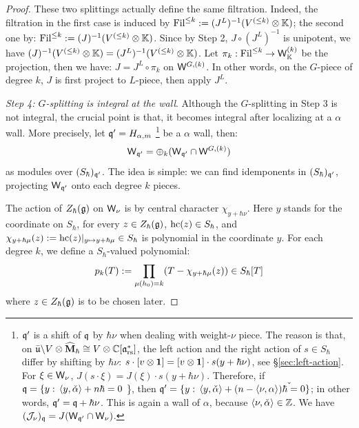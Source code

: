 \documentclass{article}
\theoremstyle{plain}
\theoremstyle{definition}
\theoremstyle{remark}
\numberwithin{equation}{section}
\begin{document}
\begin{proof}
These two splittings actually define the same filtration. Indeed, the filtration in the first case is induced by $\mathrm{Fil}^{\leq k} := (J^L)^{-1} (V^{(\leq k)}\otimes \mathbb K ) $; the second one by: $\mathrm{Fil}^{\leq k} := (J)^{-1} (V^{(\leq k)}\otimes \mathbb K )$. Since by Step 2, $J\circ (J^L)^{-1}$ is unipotent, we have $(J)^{-1} (V^{(\leq k)}\otimes \mathbb K ) = (J^L)^{-1} (V^{(\leq k)}\otimes \mathbb K )$. Let $\pi_k : \mathrm{Fil}^{\leq k} \to \mathsf W_{\mathbb K}^{(k)} $ be the projection, then we have: $J = J^L \circ \pi_k$ on $\mathsf W^{G,(k)}$. In other words, on the $G$-piece of degree $k$, $J$ is first project to $L$-piece, then apply $J^L$.

\emph{Step 4: $G$-splitting is integral at the wall}. Although the $G$-splitting in Step 3 is not integral, the crucial point is that, it becomes integral after localizing at a $\alpha$ wall. More precisely, let $\mathfrak q' = H_{\alpha,m}$ \footnote{$\mathfrak q'$ is a shift of $\mathfrak q$ by $\hbar \nu$ when dealing with weight-$\nu$ piece. The reason is that, on $\bar{\mathfrak{u}} \backslash V\otimes \widehat{\mathbf{M}}_\hbar \cong V\otimes \mathbb{C} [\mathfrak{a}^*_{\mathrm{rs}}]$, the left action and the right action of $s\in S_\hbar$ differ by shifting by $\hbar \nu$: $s\cdot [v\otimes \mathbf 1] = [v\otimes \mathbf 1] \cdot s(y+\hbar\nu)$, see \S\ref{sec:left-action}. For $\xi \in \mathsf W_\nu$, $J(s\cdot \xi) = J(\xi) \cdot s(y+\hbar\nu)$. Therefore, if $\mathfrak q = \{ y:\, \langle y,\check{\alpha} \rangle +n\hbar =0$ \}, then $\mathfrak q' = \{ y:\, \langle y,\check{\alpha} \rangle + (n-\langle\nu,\check{\alpha\rangle)\hbar =0\}}$; in other words, $\mathfrak q' = \mathfrak q + \hbar\nu$. This is again a wall of $\alpha$, because $\langle\nu, \check{\alpha}\rangle \in \mathbb{Z}$. We have $(\mathcal J_\nu)_\mathfrak q = J(\mathsf W_{\mathfrak q'}\cap \mathsf W_{\nu})$.} be a $\alpha$ wall, then:
\begin{equation}\label{eq:Wsplit}
    \mathsf W_{\mathfrak q'} = \oplus_{k} (\mathsf W_{\mathfrak q'} \cap  \mathsf W^{G,(k)} )
\end{equation}
as modules over $(S_\hbar)_{\mathfrak q'}$. The idea is simple: we can find idemponents in $(S_\hbar)_{\mathfrak q'}$, projecting $\mathsf W_{\mathfrak q'}$ onto each degree $k$ pieces. 

The action of $Z_\hbar(\mathfrak{g})$ on $\mathsf W_\nu$ is by central character $\chi_{y+\hbar\nu}$. Here $y$ stands for the coordinate on $S_\hbar$, for every $z \in Z_\hbar(\mathfrak{g})$, $\operatorname{hc} (z) \in S_
\hbar$, and $\chi_{y+\hbar\mu}(z) :=\operatorname{hc} (z)|_{y\mapsto y+ \hbar\mu} \in S_\hbar
$ is polynomial in the coordinate $y$. For each degree $k$, we define a $S_\hbar$-valued polynomial:
\begin{equation*}
    p_k(T):=\prod_{\mu(h_0)=k}(T-\chi_{y+\hbar\mu}(z))\in S_\hbar[T]
\end{equation*}
where $z \in Z_\hbar(\mathfrak{g})$ is to be chosen later. 


\end{proof}
\end{document}

